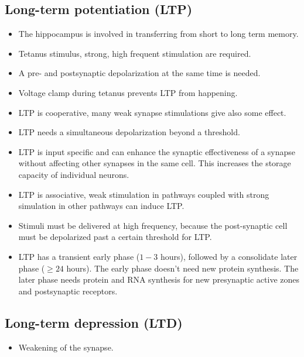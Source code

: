 \documentclass[main]{subfiles}
\begin{document}
\subsection{Long-term potentiation (LTP)}
\begin{itemize}[noitemsep,nolistsep]
	\item The hippocampus is involved in transferring from short to long term memory.
	\item Tetanus stimulus, strong, high frequent stimulation are required.
	\item A pre- and postsynaptic depolarization at the same time is needed.
	\item Voltage clamp during tetanus prevents LTP from happening.
	\item LTP is cooperative, many weak synapse stimulations give also some effect.
	\item LTP needs a simultaneous depolarization beyond a threshold.
	\item LTP is input specific and can enhance the synaptic effectiveness of a synapse without affecting other synapses in the same cell. This increases the storage capacity of individual neurons.
	\item LTP is associative, weak stimulation in pathways coupled with strong simulation in other pathways can induce LTP.
	\item Stimuli must be delivered at high frequency, because the post-synaptic cell must be depolarized past a certain threshold for LTP.
	\item LTP has a transient early phase ($1-3$ hours), followed by a consolidate later phase ($\geq 24$ hours). The early phase doesn't need new protein synthesis. The later phase needs protein and RNA synthesis for new presynaptic active zones and postsynaptic receptors.
\end{itemize}

\subsection{Long-term depression (LTD)}
\begin{itemize}[noitemsep,nolistsep]
	\item Weakening of the synapse.
\end{itemize}
\end{document}
